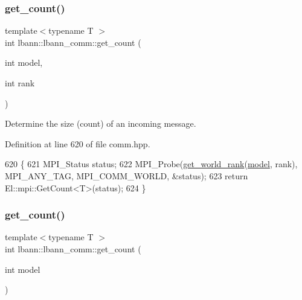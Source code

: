 \mbox{\label{classlbann_1_1lbann__comm_aa1db618eb587ead21fb0420bf94bfd45}} 
\subsubsection{\texorpdfstring{get\+\_\+count()}{get\_count()}\hspace{0.1cm}{\footnotesize\ttfamily [1/2]}}
{\footnotesize\ttfamily template$<$typename T $>$ \\
int lbann\+::lbann\+\_\+comm\+::get\+\_\+count (\begin{DoxyParamCaption}\item[{int}]{model,  }\item[{int}]{rank }\end{DoxyParamCaption})\hspace{0.3cm}{\ttfamily [inline]}}

Determine the size (count) of an incoming message. 

Definition at line 620 of file comm.\+hpp.


\begin{DoxyCode}
620                                                            \{
621     MPI\_Status status;
622     MPI\_Probe(\hyperlink{classlbann_1_1lbann__comm_ab3b1ebe8b72575094405eb2e37bb447d}{get\_world\_rank}(\hyperlink{namespacelbann_adee41f31f15f3906cbdcce4a1417eb56a20f35e630daf44dbfa4c3f68f5399d8c}{model}, rank), MPI\_ANY\_TAG, MPI\_COMM\_WORLD, &status);
623     \textcolor{keywordflow}{return} El::mpi::GetCount<T>(status);
624   \}
\end{DoxyCode}
\mbox{\label{classlbann_1_1lbann__comm_a54544a1b1a691fa7b6314da5682f184c}} 
\subsubsection{\texorpdfstring{get\+\_\+count()}{get\_count()}\hspace{0.1cm}{\footnotesize\ttfamily [2/2]}}
{\footnotesize\ttfamily template$<$typename T $>$ \\
int lbann\+::lbann\+\_\+comm\+::get\+\_\+count (\begin{DoxyParamCaption}\item[{int}]{model }\end{DoxyParamCaption})\hspace{0.3cm}{\ttfamily [inline]}}



